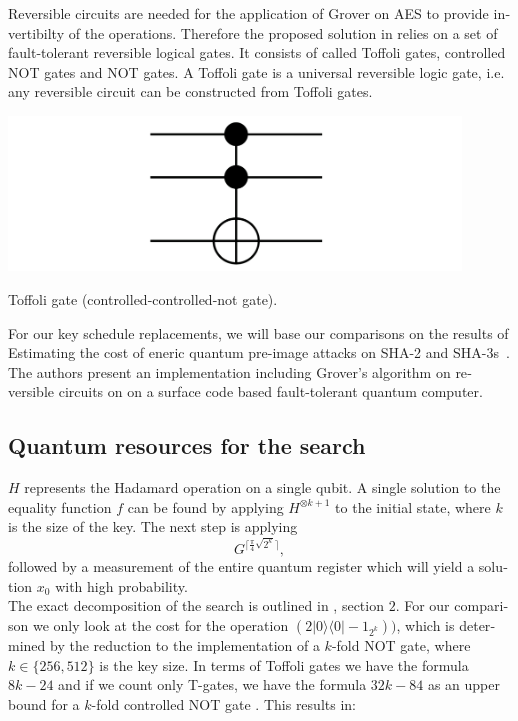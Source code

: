 \documentclass[a4paper,11pt]{article}
\begin{document}
\begin{otherlanguage}{english}
\noindent
Reversible circuits are needed for the application of Grover on \textsc{AES} to provide invertibilty of the operations. Therefore the proposed solution in \cite{GRO} relies on a set of fault-tolerant reversible logical gates. It consists of called Toffoli gates, controlled NOT gates and NOT gates. A Toffoli gate is a universal reversible logic gate, i.e. any reversible circuit can be constructed from Toffoli gates. \\

\begin{figurehere}
  \centering
  \includegraphics[width=12cm]{Toffoli.png}
  \caption{Toffoli gate (controlled-controlled-not gate).\label{abb_5}}
\end{figurehere}
\vspace{0.3cm}

\noindent
For our key schedule replacements, we will base our comparisons on the results of \glqq Estimating the cost of eneric quantum pre-image attacks on SHA-2 and SHA-3s\grqq \, \cite{QSH}. The authors present an implementation including Grover's algorithm on reversible circuits on on a surface code based fault-tolerant quantum computer.

\subsection{Quantum resources for the search}
\noindent
$H$ represents the Hadamard operation on a single qubit. A single solution to the equality function $f$ can be found by applying $H^{\otimes k+1}$ to the initial state, where $k$ is the size of the key. The next step is applying 
$$G^{\lceil \frac{\pi}{4} \sqrt{2^k}\rceil},$$ 
followed by a measurement of the entire quantum register which will yield a solution $x_0$ with high probability.\\

\noindent
The exact decomposition of the search is outlined in \cite{GRO}, section $2$. For our comparison we only look at the cost for the operation $(2 |0\rangle \langle 0| -1_{2^k}))$, which is determined by the reduction to the implementation of a $k$-fold NOT gate, where $k \in \{256,512\}$ is the key size. In terms of Toffoli gates we have the formula $8k-24$ \cite{EQC} and if we count only T-gates, we have the formula $32k-84$ as an upper bound for a $k$-fold controlled NOT gate \cite{QAN}. This results in:


\end{otherlanguage}
\end{document}

